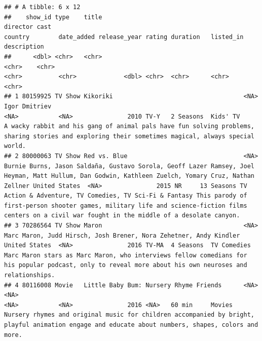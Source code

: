 \documentclass[
]{article}
\begin{document}
\begin{verbatim}
## # A tibble: 6 x 12
##    show_id type    title                                       director cast                                                                                                                                                country        date_added release_year rating duration   listed_in                                               description                                                                                                                                           
##      <dbl> <chr>   <chr>                                       <chr>    <chr>                                                                                                                                               <chr>          <chr>             <dbl> <chr>  <chr>      <chr>                                                   <chr>                                                                                                                                                 
## 1 80159925 TV Show Kikoriki                                    <NA>     Igor Dmitriev                                                                                                                                       <NA>           <NA>               2010 TV-Y   2 Seasons  Kids' TV                                                A wacky rabbit and his gang of animal pals have fun solving problems, sharing stories and exploring their sometimes magical, always special world.    
## 2 80000063 TV Show Red vs. Blue                                <NA>     Burnie Burns, Jason Saldaña, Gustavo Sorola, Geoff Lazer Ramsey, Joel Heyman, Matt Hullum, Dan Godwin, Kathleen Zuelch, Yomary Cruz, Nathan Zellner United States  <NA>               2015 NR     13 Seasons TV Action & Adventure, TV Comedies, TV Sci-Fi & Fantasy This parody of first-person shooter games, military life and science-fiction films centers on a civil war fought in the middle of a desolate canyon.  
## 3 70286564 TV Show Maron                                       <NA>     Marc Maron, Judd Hirsch, Josh Brener, Nora Zehetner, Andy Kindler                                                                                   United States  <NA>               2016 TV-MA  4 Seasons  TV Comedies                                             Marc Maron stars as Marc Maron, who interviews fellow comedians for his popular podcast, only to reveal more about his own neuroses and relationships.
## 4 80116008 Movie   Little Baby Bum: Nursery Rhyme Friends      <NA>     <NA>                                                                                                                                                <NA>           <NA>               2016 <NA>   60 min     Movies                                                  Nursery rhymes and original music for children accompanied by bright, playful animation engage and educate about numbers, shapes, colors and more.    

\end{verbatim}
\end{document}
